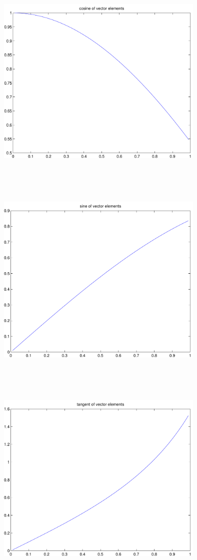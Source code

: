 \documentclass[9pt]{article}
\theoremstyle{plain}
\theoremstyle{definition}
\theoremstyle{remark}
\numberwithin{equation}{section}
\begin{document}
\includegraphics[width=10.0cm,height=10.0cm]{klVSLCos.pdf}

\includegraphics[width=10.0cm,height=10.0cm]{klVSLSin.pdf}

\includegraphics[width=10.0cm,height=10.0cm]{klVSLTan.pdf}
\end{document}
